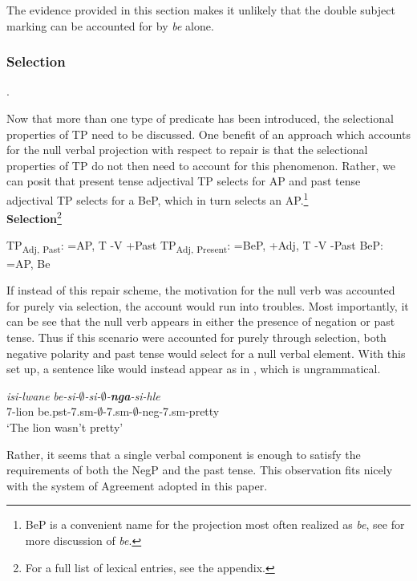 \documentclass[output=paper]{langsci/langscibook}
\newcommand{\bee}[0]{\textit {be }}
\begin{document}
The evidence provided in this section makes it unlikely that the double subject marking can be accounted for by \bee alone. 



\subsubsection{Selection}. 

Now that more than one type of predicate has been introduced, the selectional properties of TP need to be discussed. One benefit of an approach which accounts for the null verbal projection with respect to repair is that the selectional properties of TP do not then need to account for this phenomenon. Rather, we can posit that present tense adjectival TP selects for AP and past tense adjectival TP selects for a BeP, which in turn selects an AP.\footnote{BeP is a convenient name for the projection most often realized as \textit{be}, see  for more discussion of \textit{be}.}
\\

\textbf{Selection}\footnote{For a full list of lexical entries, see the appendix.}
\begin{exe}
\ex TP\textsubscript{Adj, Past}: =AP, T -V +Past
\ex TP\textsubscript{Adj, Present}: =BeP, +Adj, T -V -Past
\ex BeP: =AP, Be 
\end{exe}

If instead of this repair scheme, the motivation for the null verb was accounted for purely via selection, the account would run into troubles. Most importantly, it can be see that the null verb appears in either the presence of negation or past tense. Thus if this scenario were accounted for purely through selection, both negative polarity and past tense would select for a null verbal element. With this set up, a sentence like  would instead appear as in , which is ungrammatical.

\begin{exe}
\ex \gll *\textit{isi-lwane} \textit{be-si-$\emptyset$-si-$\emptyset$-{\bf nga}-si-hle}\\
       7-lion be.{\sc pst}-7.{\sc sm}-$\emptyset$-7.{\sc sm}-$\emptyset$-{\sc neg}-7.{\sc sm}-pretty\\
    \glt `The lion wasn't pretty' 
\end{exe}

Rather, it seems that a single verbal component is enough to satisfy the requirements of both the NegP and the past tense. This observation fits nicely with the system of Agreement adopted in this paper.
\end{document}
